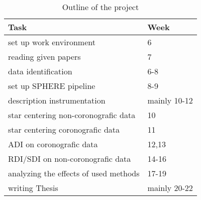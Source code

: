 \documentclass[twoside,single]{lion-msc}
\begin{document}
\begin{table}[ht]
\centering
\caption{Outline of the project}
\begin{tabular}{l|l|}
\bf{Task}					& \bf{Week}		\\\hline
set up work environment			& 6				\\
reading given papers			& 7				 \\
data identification				& 6-8			 \\
set up SPHERE pipeline			& 8-9			\\
description instrumentation		& mainly 10-12	\\
star centering non-coronografic data	& 10	 \\
star centering coronografic data & 11			 \\
ADI on coronografic data & 12,13		 \\
RDI/SDI on non-coronografic data & 14-16  \\
analyzing the effects of used methods& 17-19  \\
writing Thesis					& mainly 20-22	\\
\end{tabular}
\end{table}



\end{document}
